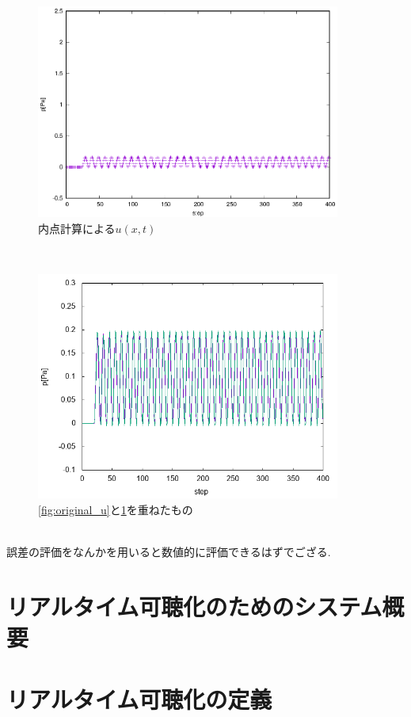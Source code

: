 \documentclass[dvipdfmx]{ampbt}
\begin{document}
\begin{figure}[H]
  \begin{center}
    \includegraphics[clip,width=10.0cm]{./eps/original_u.eps}
    \caption{内点計算による$u(x,t)$}
    \label{fig:naiten_u}
  \end{center}
\end{figure}\\
\begin{figure}[H]
  \begin{center}
    \includegraphics[clip,width=10.0cm]{./png/mix_u.png}
    \caption{\ref{fig:original_u}と\ref{fig:naiten_u}を重ねたもの}
    \label{fig:mix_u}
  \end{center}
\end{figure}\\
誤差の評価をなんかを用いると数値的に評価できるはずでござる.

\section{リアルタイム可聴化のためのシステム概要}
\section{リアルタイム可聴化の定義}
\end{document}
